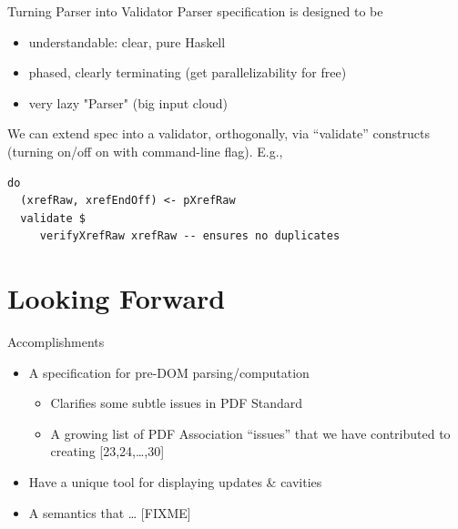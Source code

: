 \documentclass[t,10pt,xcolor={dvipsnames}]{beamer}
\begin{document}
\begin{frame}[label={sec:orga2eecdb},fragile]{Turning Parser into Validator}
 Parser specification is designed to be
\begin{itemize}
\item understandable: clear, pure Haskell
\item phased, clearly terminating (get parallelizability for free)
\item very lazy "Parser" (big input cloud)
\end{itemize}

We can extend spec into a validator, orthogonally, via “validate” constructs
(turning on/off on with command-line flag).  E.g.,
\lstset{language=haskell,label= ,caption= ,captionpos=b,numbers=none}
\begin{lstlisting}
do
  (xrefRaw, xrefEndOff) <- pXrefRaw
  validate $
     verifyXrefRaw xrefRaw -- ensures no duplicates
\end{lstlisting}
\end{frame}

\section{Looking Forward}
\label{sec:org83b8887}
\begin{frame}[label={sec:org8472c7e}]{Accomplishments}
\begin{itemize}
\item A specification for pre-DOM parsing/computation
\begin{itemize}
\item Clarifies some subtle issues in PDF Standard
\item A growing list of PDF Association “issues” that we have contributed to
creating [23,24,\ldots{},30]
\end{itemize}
\item Have a unique tool for displaying updates \& cavities
\item A semantics that \ldots{} [FIXME]
\end{itemize}
\end{frame}
\end{document}
